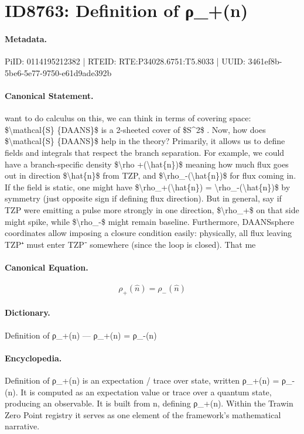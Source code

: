 \section*{ID8763: Definition of ρ\_+(n)}
\paragraph{Metadata.}
PiID: 0114195212382 | RTEID: RTE:P34028.6751:T5.8033 | UUID: 3461ef8b-5be6-5e77-9750-e61d9ade392b

\paragraph{Canonical Statement.}
want to do calculus on this, we can think in terms of covering space: \$\textbackslash{}mathcal\{S\} \{DAANS\}\$ is a 2-sheeted cover of \$S\textasciicircum{}2\$ . Now, how does \$\textbackslash{}mathcal\{S\} \{DAANS\}\$ help in the theory? Primarily, it allows us to define fields and integrals that respect the branch separation. For example, we could have a branch-specific density \$\textbackslash{}rho +(\textbackslash{}hat\{n\})\$ meaning how much flux goes out in direction \$\textbackslash{}hat\{n\}\$ from TZP, and \$\textbackslash{}rho\_-(\textbackslash{}hat\{n\})\$ for flux coming in. If the field is static, one might have \$\textbackslash{}rho\_+(\textbackslash{}hat\{n\}) = \textbackslash{}rho\_-(\textbackslash{}hat\{n\})\$ by symmetry (just opposite sign if defining flux direction). But in general, say if TZP were emitting a pulse more strongly in one direction, \$\textbackslash{}rho\_+\$ on that side might spike, while \$\textbackslash{}rho\_-\$ might remain baseline. Furthermore, DAANSsphere coordinates allow imposing a closure condition easily: physically, all flux leaving TZP⁺ must enter TZP⁻ somewhere (since the loop is closed). That me

\paragraph{Canonical Equation.}
\[
\rho_+(\hat{n}) = \rho_-(\hat{n})
\]

\paragraph{Dictionary.}
Definition of ρ\_+(n) — ρ\_+(n) = ρ\_-(n)

\paragraph{Encyclopedia.}
Definition of ρ\_+(n) is an expectation / trace over state, written ρ\_+(n) = ρ\_-(n). It is computed as an expectation value or trace over a quantum state, producing an observable. It is built from n, defining ρ\_+(n). Within the Trawin Zero Point registry it serves as one element of the framework's mathematical narrative.

